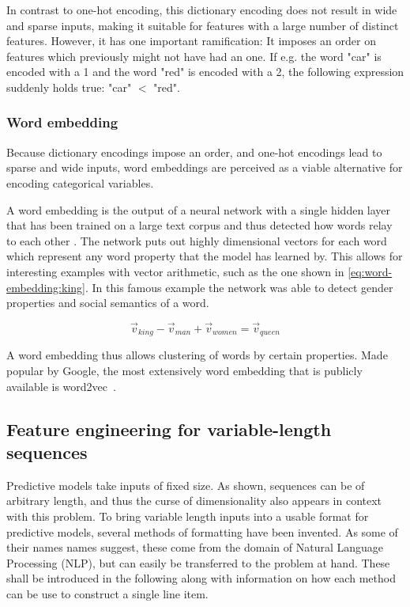 In contrast to one-hot encoding, this dictionary encoding does not result in wide and sparse inputs, making it suitable for features with a large number of distinct features. However, it has one important ramification: It imposes an order on features which previously might not have had an one. If e.g. the word "car" is encoded with a 1 and the word "red" is encoded with a 2, the following expression suddenly holds true: "car" $<$ "red".

\subsubsection*{Word embedding}
Because dictionary encodings impose an order, and one-hot encodings lead to sparse and wide inputs, word embeddings are perceived as a viable alternative for encoding categorical variables.

A word embedding is the output of a neural network with a single hidden layer that has been trained on a large text corpus and thus detected how words relay to each other \cite{web:word-embedding}. The network puts out highly dimensional vectors for each word which represent any word property that the model has learned by. This allows for interesting examples with vector arithmetic, such as the one shown in \autoref{eq:word-embedding:king}. In this famous example the network was able to detect gender properties and social semantics of a word. 

\begin{equation}
    \label{eq:word-embedding:king}
    \vec{v}_{king} - \vec{v}_{man} + \vec{v}_{women} = \vec{v}_{queen}
\end{equation}

A word embedding thus allows clustering of words by certain properties.
Made popular by Google, the most extensively word embedding that is publicly available is word2vec~\cite{web:ahogrammer, goldberg2014word2vec}.

\subsection{Feature engineering for variable-length sequences}
Predictive models take inputs of fixed size. As shown, sequences can be of arbitrary length, and thus the curse of dimensionality also appears in context with this problem. To bring variable length inputs into a usable format for predictive models, several methods of formatting have been invented. As some of their names names suggest, these come from the domain of Natural Language Processing (NLP), but can easily be transferred to the problem at hand. These shall be introduced in the following along with information on how each method can be use to construct a single line item.

